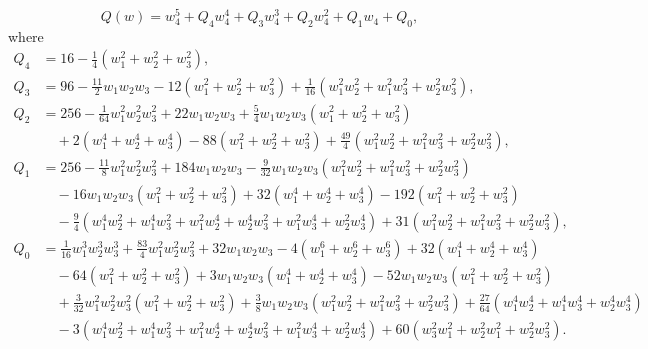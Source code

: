 \documentclass[a4paper,reqno]{amsart}
\numberwithin{equation}{section}
\numberwithin{equation}{section}
\begin{document}
\begin{equation*}
    Q(w)= w_4^{5} + Q_4 w_4^4+Q_3 w_4^3+ Q_2 w_4^2+Q_1 w_4 + Q_0,
\end{equation*}
where
\begin{align*}
    Q_4 &= 16-\frac{1}{4}\left(w_1^2+w_2^2+w_3^2\right),
     \\
    Q_3 &=   96
    -\frac{11}{2} w_1 w_2 w_3 
    -12 (w_1^2+ w_2^2+ w_3^2)
    + \frac{1}{16}\left(w_1^2 w_2^2 +w_1^2 w_3^2 +w_2^2 w_3^2\right) ,
      \\
    Q_2  &= 256 
    -\frac{1}{64}w_1^2 w_2^2 w_3^2 
    + 22 w_1w_2w_3
     +\frac{5}{4} w_1w_2w_3\left(w_1^2+ w_2^2+w_3^2\right)
    \\
    &\quad 
   +2 \left(w_1^4+ w_2^4+ w_3^4\right)
    -88 \left(w_1^2 +w_2^2+ w_3^2\right)
    +\frac{49}{4}\left(  w_1^2w_2^2 +  w_1^2w_3^2 +w_2^2 w_3^2\right)
    ,
      \\
    Q_1  &= 
        256
     -\frac{11}{8} w_1^2 w_2^2 w_3^2  
   +184 w_1 w_2 w_3 
   -\frac{9}{32}w_1w_2w_3 (w_1^2 w_2^2 +  w_1^2 w_3^2 +w_2^2 w_3^2) 
    \\
    &\quad 
    -16w_1w_2w_3 (w_1^2 + w_2^2 +  w_3^2)
    +32 (w_1^4+ w_2^4+ w_3^4)
     -192 (w_1^2+w_2^2+ w_3^2)
     \\
    &\quad 
     -\frac{9}{4}(w_1^4 w_2^2 +w_1^4 w_3^2 
     +w_1^2 w_2^4 +w_2^4 w_3^2
     +w_1^2 w_3^4  +w_2^2 w_3^4)  
   +31 (w_1^2 w_2^2 + w_1^2 w_3^2 + w_2^2 w_3^2 )
    ,
     \\
    Q_0 &=  
     \frac{1}{16}w_1^3 w_2^3 w_3^3 
    +\frac{83}{4}w_1^2 w_2^2 w_3^2  
   + 32 w_1 w_2 w_3 
    -4 \left(w_1^6
    + w_2^6
    + w_3^6    
    \right)   
   +32 \left(
    w_1^4
    + w_2^4
    + w_3^4
    \right)    
    \\
    &\quad 
    -64 \left(w_1^2
    + w_2^2
    + w_3^2 
    \right)
     +3 w_1 w_2 w_3\left( w_1^4 
     + w_2^4 
    + w_3^4\right)
    -52 w_1 w_2 w_3 \left( w_1^2
    + w_2^2 
    + w_3^2 
    \right) 
    \\
    &\quad 
    +\frac{3}{32} w_1^2 w_2^2 w_3^2\left( 
    w_1^2
    + w_2^2 
    + w_3^2 
    \right)
    +\frac{3}{8} w_1w_2w_3\left(   w_1^2 w_2^2
    + w_1^2 w_3^2 
    +  w_2^2 w_3^2
    \right)
    +\frac{27}{64} \left(w_1^4 w_2^4 
    + w_1^4 w_3^4 
    +  w_2^4 w_3^4
    \right)    
    \\
    &\quad 
    -3 \left(  
    w_1^4 w_2^2 
    +w_1^4 w_3^2 
    +w_1^2 w_2^4 
    +w_2^4 w_3^2
    +w_1^2 w_3^4  
    +w_2^2 w_3^4
    \right)
    +60 \left( w_3^2 w_1^2
    + w_2^2 w_1^2
    + w_2^2 w_3^2
    \right).
    \end{align*}
\end{document}
